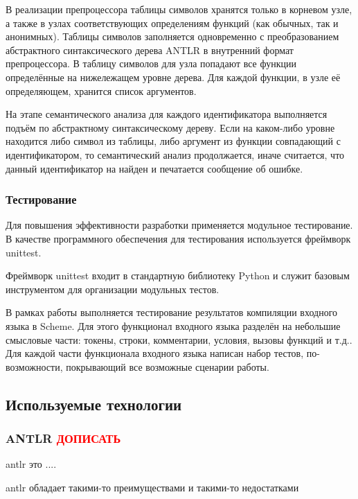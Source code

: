 \documentclass[12pt,a4paper,oneside]{extarticle}
\begin{document}
            В реализации препроцессора таблицы символов хранятся только в корневом узле, а также в узлах соответствующих определениям функций (как обычных, так и анонимных). Таблицы символов заполняется одновременно с преобразованием абстрактного синтаксического дерева ANTLR в внутренний формат препроцессора. В таблицу символов для узла попадают все функции определённые на нижележащем уровне дерева. Для каждой функции, в узле её определяющем, хранится список аргументов.

            На этапе семантического анализа для каждого идентификатора выполняется подъём по абстрактному синтаксическому дереву. Если на каком-либо уровне находится либо символ из таблицы, либо аргумент из функции совпадающий с идентификатором, то семантический анализ продолжается, иначе считается, что данный идентификатор на найден и печатается сообщение об ошибке.

        \subsubsection{Тестирование}
            Для повышения эффективности разработки применяется модульное тестирование.
            В качестве программного обеспечения для тестирования используется фреймворк unittest.

            Фреймворк unittest входит в стандартную библиотеку Python и служит базовым инструментом для организации модульных тестов.

            В рамках работы выполняется тестирование результатов компиляции входного языка в Scheme.
            Для этого функционал входного языка разделён на небольшие смысловые части: токены, строки, комментарии, условия, вызовы функций и т.д..
            Для каждой части функционала входного языка написан набор тестов, по-возможности, покрывающий все возможные сценарии работы.
    \clearpage

    \subsection{Используемые технологии}
        \subsubsection{ANTLR \textcolor{red}{ДОПИСАТЬ}}
            \label{subsec:antlr}
            antlr это ....

            antlr обладает такими-то преимуществами и такими-то недостатками
\end{document}
